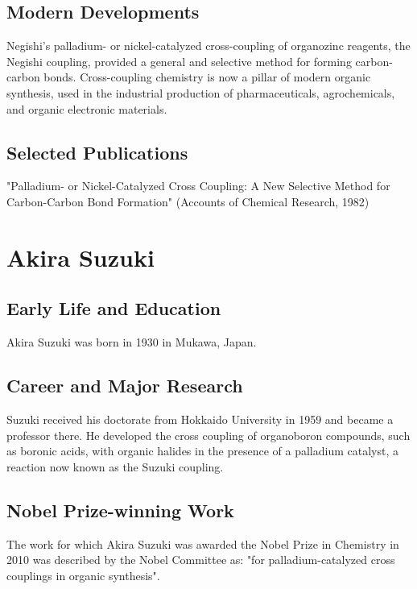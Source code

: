\subsection*{Modern Developments}

Negishi's palladium- or nickel-catalyzed cross-coupling of organozinc reagents, the Negishi coupling, provided a general and selective method for forming carbon-carbon bonds. Cross-coupling chemistry is now a pillar of modern organic synthesis, used in the industrial production of pharmaceuticals, agrochemicals, and organic electronic materials.

\subsection*{Selected Publications}

"Palladium- or Nickel-Catalyzed Cross Coupling: A New Selective Method for Carbon-Carbon Bond Formation" (Accounts of Chemical Research, 1982)

\clearpage

\section{Akira Suzuki}

\subsection*{Early Life and Education}

Akira Suzuki was born in 1930 in Mukawa, Japan.

\subsection*{Career and Major Research}

Suzuki received his doctorate from Hokkaido University in 1959 and became a professor there. He developed the cross coupling of organoboron compounds, such as boronic acids, with organic halides in the presence of a palladium catalyst, a reaction now known as the Suzuki coupling.

\subsection*{Nobel Prize-winning Work}

The work for which Akira Suzuki was awarded the Nobel Prize in Chemistry in 2010 was described by the Nobel Committee as: "for palladium-catalyzed cross couplings in organic synthesis".

